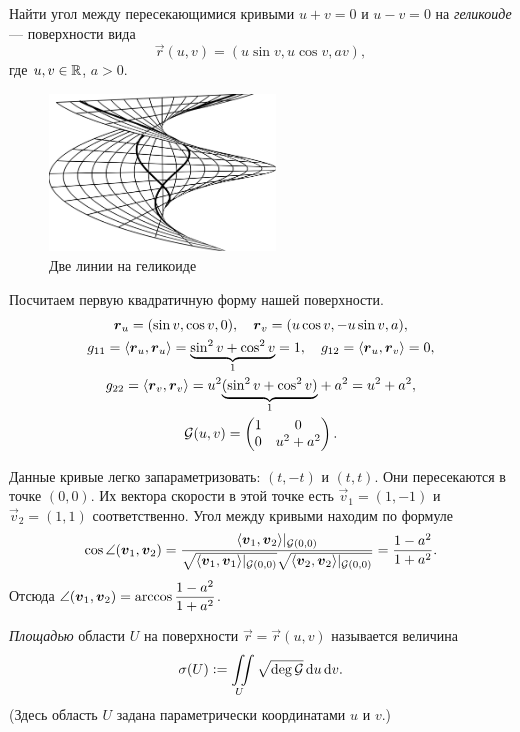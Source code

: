 \begin{problem}
	Найти угол между пересекающимися кривыми $u + v = 0$ и $u - v = 0$ на \textit{геликоиде} --- поверхности вида
	\[
		\vec{r}(u, v) = (u\sin v, u\cos v, av),
	\]
	где $u, v \in \mathbb{R}$, $a > 0$.
\end{problem}

\begin{figure}[H]
	\centering
	\includegraphics[width=6cm]{./img/HelicoidCurves.pdf}
	\caption{Две линии на геликоиде}
\end{figure}

\begin{solution}
	Посчитаем первую квадратичную форму нашей поверхности.
	\begin{gather*}
		\boldsymbol{r}_u = (\sin v, \cos v, 0),\quad \boldsymbol{r}_v = (u\cos v, -u\sin v, a),\\
		g_{11} = \langle\boldsymbol{r}_u, \boldsymbol{r}_u\rangle = {\underbrace{\sin^2v + \cos^2v}_{1}} = 1,\quad g_{12} = \langle\boldsymbol{r}_u, \boldsymbol{r}_v\rangle = 0,\\
		g_{22} = \langle\boldsymbol{r}_v, \boldsymbol{r}_v\rangle = u^2{\underbrace{(\sin^2v + \cos^2v)}_{1}} + a^2 = u^2 + a^2,\\
		\mathcal{G}(u, v) =
		\begin{pmatrix}
			1 & 0\\
			0 & u^2 + a^2
		\end{pmatrix}.
	\end{gather*}

	Данные кривые легко запараметризовать: $(t, -t)$ и $(t, t)$. Они пересекаются в точке $(0, 0)$. Их вектора скорости в этой точке есть $\vec{v}_1 = (1, -1)$ и $\vec{v}_2 = (1, 1)$ соответственно. Угол между кривыми находим по формуле
	\[
		\cos\angle(\boldsymbol{v}_1, \boldsymbol{v}_2) = \frac{\langle\boldsymbol{v}_1, \boldsymbol{v}_2\rangle|_{\mathcal{G}(0, 0)}}{\sqrt{\langle\boldsymbol{v}_1, \boldsymbol{v}_1\rangle|_{\mathcal{G}(0, 0)}}\sqrt{\langle\boldsymbol{v}_2, \boldsymbol{v}_2\rangle|_{\mathcal{G}(0, 0)}}} = \frac{1 - a^2}{1 + a^2}.
	\]
	Отсюда $\displaystyle\angle(\boldsymbol{v}_1, \boldsymbol{v}_2) = \arccos\frac{1 - a^2}{1 + a^2}$.
\end{solution}

\begin{definition}
	\textit{Площадью} области $U$ на поверхности $\vec{r} = \vec{r}(u, v)$ называется величина
	\[
		\sigma(U) \vcentcolon = \iint\limits_{U}\sqrt{\deg\mathcal{G}}\mathop{}\!\mathrm{d} u\mathop{}\!\mathrm{d} v.
	\]
	(Здесь область $U$ задана параметрически координатами $u$ и $v$.)
\end{definition}

